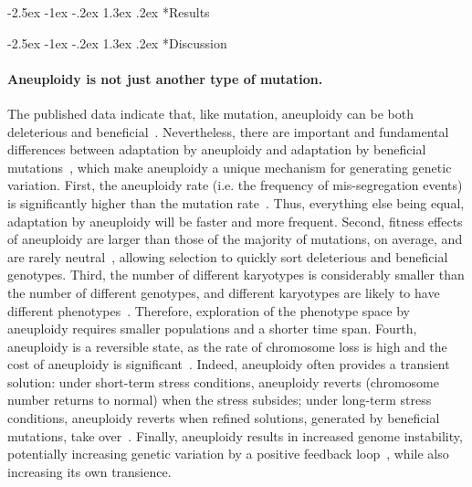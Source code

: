 \documentclass[12pt]{extarticle}
\makeatletter
\renewcommand\section{\@startsection {section}{1}{\z@}%
     {-2.5ex \@plus -1ex \@minus -.2ex}%
     {1.3ex \@plus.2ex}%
    {\Large\bfseries}}
\makeatother
\begin{document}
 
\pagebreak
\section*{Results}

\pagebreak
\section*{Discussion}

\paragraph*{Aneuploidy is not just another type of mutation.}
The published data indicate that, like mutation, aneuploidy can be both deleterious and beneficial~\citep{Pavelka2010, Sheltzer2011}.
Nevertheless, there are important and fundamental differences between adaptation by aneuploidy
and adaptation by beneficial mutations~\citep{Yona2015}, which make aneuploidy a unique mechanism for generating genetic
variation.
First, the aneuploidy rate (i.e. the frequency of mis-segregation events) is significantly higher than the
mutation rate~\citep{Santaguida2015review}.
Thus, everything else being equal, adaptation by aneuploidy will be faster and more frequent.
Second, fitness effects of aneuploidy are larger than those of the majority of mutations, on average, and are rarely
neutral~\citep{Pavelka2010, Yona2012, Sunshine2015}, allowing selection to quickly sort deleterious and beneficial genotypes.
Third, the number of different karyotypes is considerably smaller than the number of different genotypes, and different karyotypes are likely to have different phenotypes~\citep{Pavelka2010}.
Therefore, exploration of the phenotype space by aneuploidy requires smaller populations and a shorter time span.
Fourth, aneuploidy is a reversible state, as the rate of chromosome loss is high and the cost of aneuploidy is significant~\citep{Niwa2006}.
Indeed, aneuploidy often provides a transient solution: under short-term stress conditions, aneuploidy reverts (chromosome number returns to normal) when the stress subsides; under long-term stress conditions, aneuploidy reverts when refined solutions, generated by beneficial mutations, take over~\citep{Yona2012}.
Finally, aneuploidy results in increased genome instability, potentially increasing genetic variation by a positive feedback loop~\citep{Rancati2013, Bouchonville2009, Zhu2012}, while also increasing its own transience.
\end{document}
